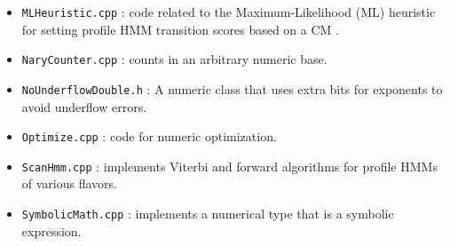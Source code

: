 \documentclass[letterpaper,12pt]{report}
\begin{document}
\begin{itemize}
\item {\tt MLHeuristic.cpp} : code related to the Maximum-Likelihood (ML) heuristic for setting profile HMM transition scores based on a CM \cite{zashaRECOMB}.
\item {\tt NaryCounter.cpp} : counts in an arbitrary numeric base.
\item {\tt NoUnderflowDouble.h} : A numeric class that uses extra bits for exponents to avoid underflow errors.
\item {\tt Optimize.cpp} : code for numeric optimization.
\item {\tt ScanHmm.cpp} : implements Viterbi and forward algorithms for profile HMMs of various flavors.
\item {\tt SymbolicMath.cpp} : implements a numerical type that is a symbolic expression.
\end{itemize}



\end{document}
